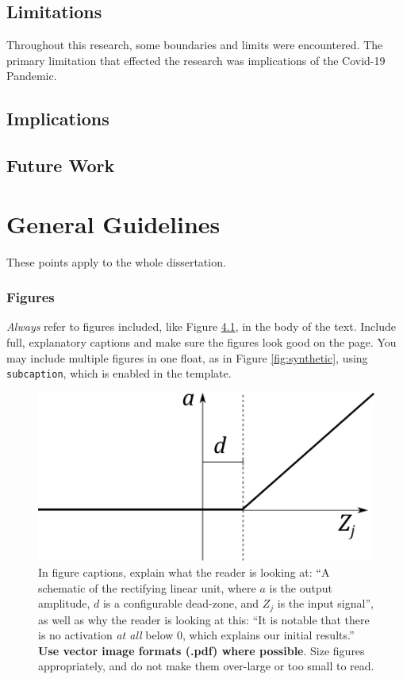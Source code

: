 \documentclass{l4proj}
\begin{document}
\section{Limitations}
Throughout this research, some boundaries and limits were encountered. The primary limitation that effected the research was implications of the Covid-19 Pandemic. 

\section{Implications}

\section{Future Work}


\chapter{General Guidelines}

These points apply to the whole dissertation.

\subsection{Figures}
\emph{Always} refer to figures included, like Figure \ref{fig:relu}, in the body of the text. Include full, explanatory captions and make sure the figures look good on the page.
You may include multiple figures in one float, as in Figure \ref{fig:synthetic}, using \texttt{subcaption}, which is enabled in the template.



\begin{figure}
    \centering
    \includegraphics[width=0.5\linewidth]{images/relu.pdf}    

    \caption{In figure captions, explain what the reader is looking at: ``A schematic of the rectifying linear unit, where $a$ is the output amplitude,
    $d$ is a configurable dead-zone, and $Z_j$ is the input signal'', as well as why the reader is looking at this: 
    ``It is notable that there is no activation \emph{at all} below 0, which explains our initial results.'' 
    \textbf{Use vector image formats (.pdf) where possible}. Size figures appropriately, and do not make them over-large or too small to read.
    }

    \label{fig:relu} 
\end{figure}
\end{document}
